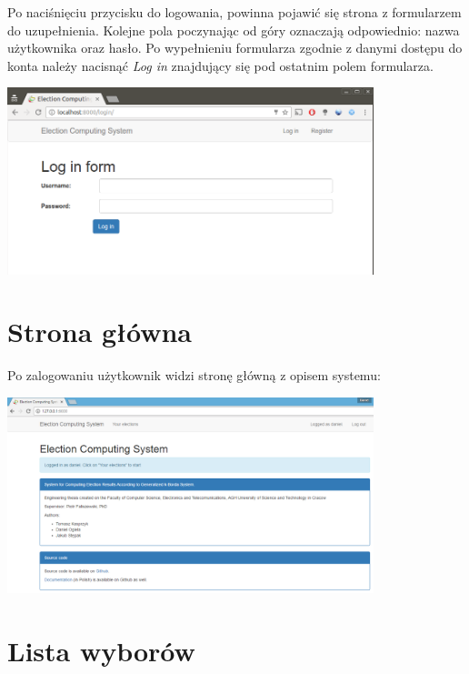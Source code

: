 \documentclass[pdflatex,11pt]{../aghdoc_version2}
\begin{document}
\newpage
Po naciśnięciu przycisku do logowania, powinna pojawić się strona z formularzem do uzupełnienia. Kolejne pola poczynając od góry oznaczają odpowiednio: nazwa użytkownika oraz hasło. Po wypełnieniu formularza zgodnie z danymi dostępu do konta należy nacisnąć \textit{Log in} znajdujący się pod ostatnim polem formularza. \\

\begin{center}
\includegraphics[width=0.8\textwidth]{pics/login.png}
\end{center}

\section{Strona główna}
\label{sec:stronaglowna}

Po zalogowaniu użytkownik widzi stronę główną z opisem systemu: \\

\begin{center}
\includegraphics[width=0.8\textwidth]{pics/mainpage_version2.png}
\end{center}

\newpage
\section{Lista wyborów}
\label{sec:electionslist}
\end{document}
